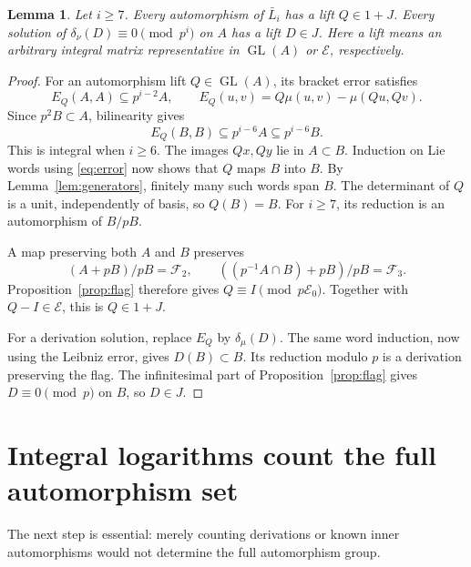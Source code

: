 \documentclass[11pt]{article}
\newtheorem{lemma}[theorem]{Lemma}
\theoremstyle{definition}\newtheorem{definition}[theorem]{Definition}
\theoremstyle{remark}\newtheorem{remark}[theorem]{Remark}
\DeclareMathOperator{\GL}{GL}
\newcommand{\EE}{\mathcal E}
\newcommand{\FF}{\mathcal F}
\begin{document}
\begin{lemma}\label{lem:lift}
Let $i\ge7$.
Every automorphism of $\bar L_i$ has a lift $Q\in1+J$.
Every solution of $\delta_\nu(D)\equiv0\pmod{p^i}$ on $A$ has a lift
$D\in J$. Here a lift means an arbitrary integral matrix representative
in $\GL(A)$ or $\EE$, respectively.
\end{lemma}
\begin{proof}
For an automorphism lift $Q\in\GL(A)$, its bracket error satisfies
\[
 E_Q(A,A)\subseteq p^{i-2}A,\qquad
 E_Q(u,v)=Q\mu(u,v)-\mu(Qu,Qv).
\]
Since $p^2B\subset A$, bilinearity gives
\begin{equation}\label{eq:error}
 E_Q(B,B)\subseteq p^{i-6}A\subseteq p^{i-6}B.
\end{equation}
This is integral when $i\ge6$. The images $Qx,Qy$ lie in $A\subset B$.
Induction on Lie words using \eqref{eq:error} now shows that $Q$ maps $B$
into $B$. By Lemma~\ref{lem:generators}, finitely many such words span $B$.
The determinant of $Q$ is a unit, independently of basis, so $Q(B)=B$.
For $i\ge7$, its reduction is an automorphism of $B/pB$.

A map preserving both $A$ and $B$ preserves
\[
 (A+pB)/pB=\FF_2,\qquad
 ((p^{-1}A\cap B)+pB)/pB=\FF_3.
\]
Proposition~\ref{prop:flag} therefore gives $Q\equiv I\pmod{p\EE_0}$.
Together with $Q-I\in\EE$, this is $Q\in1+J$.

For a derivation solution, replace $E_Q$ by $\delta_\mu(D)$.
The same word induction, now using the Leibniz error, gives $D(B)\subset B$.
Its reduction modulo $p$ is a derivation preserving the flag. The
infinitesimal part of Proposition~\ref{prop:flag} gives $D\equiv0\pmod p$
on $B$, so $D\in J$.
\end{proof}

\section{Integral logarithms count the full automorphism set}
The next step is essential: merely counting derivations or known inner
automorphisms would not determine the full automorphism group.
\end{document}
